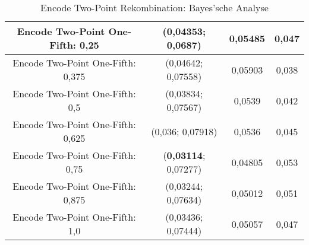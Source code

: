 \begin{table}[H]
\begin{tabular}{c | c | c | c}
		\hline
		Encode Two-Point One-Fifth: 0,25 & \color{Green}(0,04353; 0,0687)\color{black} & 0,05485 & 0,047\\
		\hline
		Encode Two-Point One-Fifth: 0,375 & \color{Green}(0,04642; 0,07558)\color{black} & 0,05903 & 0,038\\
		\hline
		Encode Two-Point One-Fifth: 0,5 & (0,03834; 0,07567) & 0,0539 & 0,042\\
		\hline
		Encode Two-Point One-Fifth: 0,625 & (0,036; 0,07918) & 0,0536 & 0,045\\
		\hline
		Encode Two-Point One-Fifth: 0,75 & (\textbf{0,03114}; 0,07277) & 0,04805 & \color{Green}0,053\color{black}\\
		\hline
		Encode Two-Point One-Fifth: 0,875 & (0,03244; 0,07634) & 0,05012 & 0,051\\
		\hline
		Encode Two-Point One-Fifth: 1,0 & (0,03436; 0,07444) & 0,05057 & 0,047\\
	\end{tabular}
	\caption{Encode Two-Point Rekombination: Bayes'sche Analyse}
	\label{table:encodeTwoPointBayesian}
\end{table} 
